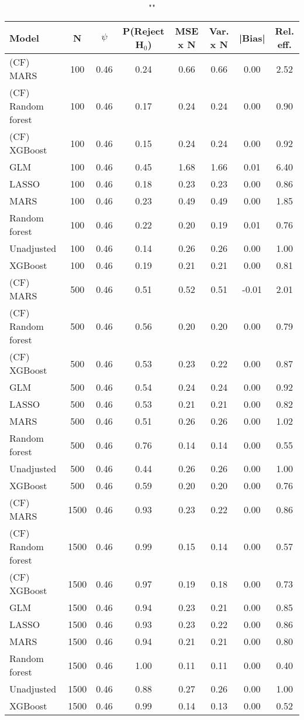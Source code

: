 \begin{table}
\centering
\caption{""}
\begin{tabular}{lccccccc}
\toprule
Model & N & $\psi$ & P(Reject H$_0$) & MSE x N & Var. x N & |Bias| & Rel. eff.\\ \midrule
(CF) MARS & 100 & 0.46 & 0.24 & 0.66 & 0.66 &  0.00 & 2.52 \\ 
(CF) Random forest & 100 & 0.46 & 0.17 & 0.24 & 0.24 &  0.00 & 0.90 \\ 
(CF) XGBoost & 100 & 0.46 & 0.15 & 0.24 & 0.24 &  0.00 & 0.92 \\ 
GLM & 100 & 0.46 & 0.45 & 1.68 & 1.66 &  0.01 & 6.40 \\ 
LASSO & 100 & 0.46 & 0.18 & 0.23 & 0.23 &  0.00 & 0.86 \\ 
MARS & 100 & 0.46 & 0.23 & 0.49 & 0.49 &  0.00 & 1.85 \\ 
Random forest & 100 & 0.46 & 0.22 & 0.20 & 0.19 &  0.01 & 0.76 \\ 
Unadjusted & 100 & 0.46 & 0.14 & 0.26 & 0.26 &  0.00 & 1.00 \\ 
XGBoost & 100 & 0.46 & 0.19 & 0.21 & 0.21 &  0.00 & 0.81 \\ \addlinespace 
(CF) MARS & 500 & 0.46 & 0.51 & 0.52 & 0.51 & -0.01 & 2.01 \\ 
(CF) Random forest & 500 & 0.46 & 0.56 & 0.20 & 0.20 &  0.00 & 0.79 \\ 
(CF) XGBoost & 500 & 0.46 & 0.53 & 0.23 & 0.22 &  0.00 & 0.87 \\ 
GLM & 500 & 0.46 & 0.54 & 0.24 & 0.24 &  0.00 & 0.92 \\ 
LASSO & 500 & 0.46 & 0.53 & 0.21 & 0.21 &  0.00 & 0.82 \\ 
MARS & 500 & 0.46 & 0.51 & 0.26 & 0.26 &  0.00 & 1.02 \\ 
Random forest & 500 & 0.46 & 0.76 & 0.14 & 0.14 &  0.00 & 0.55 \\ 
Unadjusted & 500 & 0.46 & 0.44 & 0.26 & 0.26 &  0.00 & 1.00 \\ 
XGBoost & 500 & 0.46 & 0.59 & 0.20 & 0.20 &  0.00 & 0.76 \\ \addlinespace 
(CF) MARS & 1500 & 0.46 & 0.93 & 0.23 & 0.22 &  0.00 & 0.86 \\ 
(CF) Random forest & 1500 & 0.46 & 0.99 & 0.15 & 0.14 &  0.00 & 0.57 \\ 
(CF) XGBoost & 1500 & 0.46 & 0.97 & 0.19 & 0.18 &  0.00 & 0.73 \\ 
GLM & 1500 & 0.46 & 0.94 & 0.23 & 0.21 &  0.00 & 0.85 \\ 
LASSO & 1500 & 0.46 & 0.93 & 0.23 & 0.22 &  0.00 & 0.86 \\ 
MARS & 1500 & 0.46 & 0.94 & 0.21 & 0.21 &  0.00 & 0.80 \\ 
Random forest & 1500 & 0.46 & 1.00 & 0.11 & 0.11 &  0.00 & 0.40 \\ 
Unadjusted & 1500 & 0.46 & 0.88 & 0.27 & 0.26 &  0.00 & 1.00 \\ 
XGBoost & 1500 & 0.46 & 0.99 & 0.14 & 0.13 &  0.00 & 0.52 \\
\bottomrule
\end{tabular}
\end{table}

